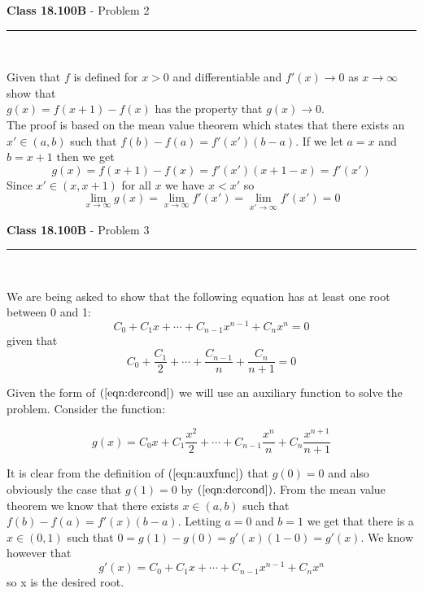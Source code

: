 \documentclass[11pt,reqno]{article}
\begin{document}
\vspace{15pt}
\begin{flushleft} 
\textbf{Class 18.100B} - Problem 2\\
\rule{500pt}{1pt}\\
\end{flushleft} 

Given that $f$ is defined for $x > 0$ and differentiable and $f'(x) \to 0$ as $x \to \infty$ show that \\
$g(x) = f(x+1) - f(x)$ has the property that $g(x) \to 0$.  \\
\indent The proof is based on the mean value theorem which states that there exists an $x' \in (a,b)$ such that $f(b)-f(a) = f'(x')(b-a)$. If we let $a = x$ and $b = x+1$ then we get 
\[ g(x) = f(x+1) - f(x) = f'(x')(x+1 - x) = f'(x') \]
Since $x' \in (x,x+1)$ for all $x$ we have $x < x'$ so 
\[ \lim_{x \to \infty} g(x) = \lim_{x \to \infty} f'(x')  =   \lim_{x' \to \infty} f'(x') = 0\]

\newpage
\vspace{15pt}
\begin{flushleft} 
\textbf{Class 18.100B} - Problem 3\\
\rule{500pt}{1pt}\\
\end{flushleft} 

We are being asked to show that the following equation has at least one root between 0 and 1:
\[ C_0 + C_1 x + \cdots + C_{n-1} x^{n-1} + C_n x^n = 0 \] 
 given that 
 \begin{equation} 
 C_0 + \frac{C_1}{2} + \cdots +\frac{C_{n-1}}{n} + \frac{C_n}{n+1}  = 0 \label{eqn:dercond}
 \end{equation}
 
 \noindent Given the form of $(\ref{eqn:dercond})$ we will use an auxiliary function to solve the problem. Consider the function:
 
 \begin{equation} 
 g(x) = C_0 x + C_1 \frac{x^2}{2} + \cdots + C_{n-1} \frac{x^n}{n} + C_n \frac{x^{n+1}}{n+1} \label{eqn:auxfunc}
 \end{equation}
 
\noindent It is clear from the definition of $(\ref{eqn:auxfunc})$ that $g(0) = 0$ and also obviously the case that $g(1) = 0$ by $(\ref{eqn:dercond})$. From the mean value theorem we know that there exists $x \in (a,b)$ such that $f(b) - f(a) = f'(x)(b-a)$. Letting $a = 0$ and $b = 1$ we get that there is a $x \in (0,1)$ such that $0 = g(1)-g(0)  = g'(x)(1 - 0) = g'(x)$. We know however that 
\[ g'(x) =  C_0 + C_1 x + \cdots + C_{n-1} x^{n-1} + C_n x^n \]
so x is the desired root.
 
\end{document}
